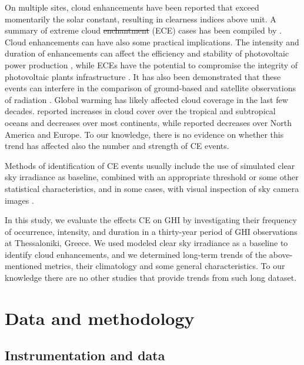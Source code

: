 \documentclass[preprint, 5p,
authoryear]{elsarticle} %
\providecommand{\DIFaddtex}[1]{{\protect\color{blue}\uwave{#1}}} %
\providecommand{\DIFdeltex}[1]{{\protect\color{red}\sout{#1}}}                      %
\providecommand{\DIFaddbegin}{} %
\providecommand{\DIFaddend}{} %
\providecommand{\DIFdelbegin}{} %
\providecommand{\DIFdelend}{} %
\providecommand{\DIFadd}[1]{\texorpdfstring{\DIFaddtex{#1}}{#1}} %
\providecommand{\DIFdel}[1]{\texorpdfstring{\DIFdeltex{#1}}{}} %
\newcommand{\DIFscaledelfig}{0.5}
\newlength{\DIFdelgraphicswidth} %
\newlength{\DIFdelgraphicsheight} %
\newcommand{\DIFaddincludegraphics}[2][]{{\color{blue}\fbox{\DIFOincludegraphics[#1]{#2}}}} %
\newcommand{\DIFdelincludegraphics}[2][]{%
\sbox{\DIFdelgraphicsbox}{\DIFOincludegraphics[#1]{#2}}%
\settoboxwidth{\DIFdelgraphicswidth}{\DIFdelgraphicsbox} %
\settoboxtotalheight{\DIFdelgraphicsheight}{\DIFdelgraphicsbox} %
\scalebox{\DIFscaledelfig}{%
\parbox[b]{\DIFdelgraphicswidth}{\usebox{\DIFdelgraphicsbox}\\[-\baselineskip] \rule{\DIFdelgraphicswidth}{0em}}\llap{\resizebox{\DIFdelgraphicswidth}{\DIFdelgraphicsheight}{%
\setlength{\unitlength}{\DIFdelgraphicswidth}%
\begin{picture}(1,1)%
\thicklines\linethickness{2pt} %
{\color[rgb]{1,0,0}\put(0,0){\framebox(1,1){}}}%
{\color[rgb]{1,0,0}\put(0,0){\line( 1,1){1}}}%
{\color[rgb]{1,0,0}\put(0,1){\line(1,-1){1}}}%
\end{picture}%
}\hspace*{3pt}}} %
} %
\DeclareRobustCommand{\DIFaddbegin}{\DIFOaddbegin \let\includegraphics\DIFaddincludegraphics} %
\DeclareRobustCommand{\DIFaddend}{\DIFOaddend \let\includegraphics\DIFOincludegraphics} %
\DeclareRobustCommand{\DIFdelbegin}{\DIFOdelbegin \let\includegraphics\DIFdelincludegraphics} %
\DeclareRobustCommand{\DIFdelend}{\DIFOaddend \let\includegraphics\DIFOincludegraphics} %
\begin{document}
On multiple sites, cloud enhancements have been reported that exceed
momentarily the solar constant, resulting in clearness indices above
unit. A summary of extreme cloud \DIFdelbegin \DIFdel{enchantment }\DIFdelend \DIFaddbegin \DIFadd{enhancement }\DIFaddend (ECE) cases has been
compiled by \citet{Martins2022}. Cloud enhancements can have also some
practical implications. The intensity and duration of enhancements can
affect the efficiency and stability of photovoltaic power production
\citep{Lappalainen2020, Jaervelae2020}, while ECEs have the potential to
compromise the integrity of photovoltaic plants infrastructure
\citep{DoNascimento2019}. It has also been demonstrated that these
events can interfere in the comparison of ground-based and satellite
observations of radiation \citep{Damiani2018}. Global warming has likely
affected cloud coverage in the last few decades. \citet{Liu2023}
reported increases in cloud cover over the tropical and subtropical
oceans and decreases over most continents, while \citet{Dong2023}
reported decreases over North America and Europe. To our knowledge,
there is no evidence on whether this trend has affected also the number
and strength of CE events.

Methods of identification of CE events usually include the use of
simulated clear sky irradiance as baseline, combined with an appropriate
threshold or some other statistical characteristics, and in some cases,
with visual inspection of sky camera images \citep[ and references
therein]{Vamvakas2020, Mol2023}.

In this study, we evaluate the effects \DIFaddbegin \DIFadd{of }\DIFaddend CE on GHI by investigating
their frequency of occurrence, intensity, and duration in a thirty-year
period of GHI observations at Thessaloniki, Greece. We used modeled
clear sky irradiance as a baseline to identify cloud enhancements, and
we determined long-term trends of the above-mentioned metrics, their
climatology and some general characteristics. To our knowledge there are
no other studies that provide trends from such long dataset.

\hypertarget{data-and-methodology}{%
\section{Data and methodology}\label{data-and-methodology}}

\hypertarget{instrumentation-and-data}{%
\subsection{Instrumentation and data}\label{instrumentation-and-data}}
\end{document}
